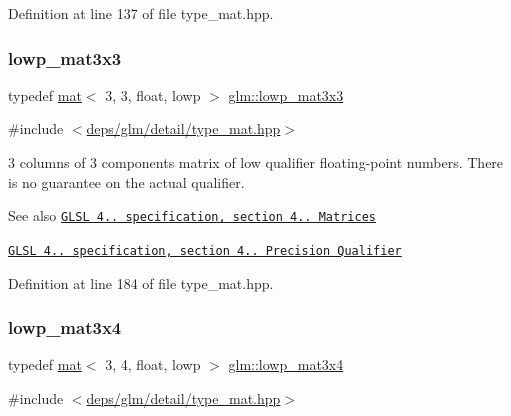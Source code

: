 Definition at line 137 of file type\+\_\+mat.\+hpp.

\mbox{\label{group__core__precision_ga6880ce658287c90c081aa60fa1f6f0a5}} 
\subsubsection{\texorpdfstring{lowp\+\_\+mat3x3}{lowp\_mat3x3}}
{\footnotesize\ttfamily typedef \hyperlink{structglm_1_1mat}{mat}$<$ 3, 3, float, lowp $>$ \hyperlink{group__core__precision_ga6880ce658287c90c081aa60fa1f6f0a5}{glm\+::lowp\+\_\+mat3x3}}



{\ttfamily \#include $<$\hyperlink{type__mat_8hpp}{deps/glm/detail/type\+\_\+mat.\+hpp}$>$}

3 columns of 3 components matrix of low qualifier floating-\/point numbers. There is no guarantee on the actual qualifier.

\begin{DoxySeeAlso}{See also}
\href{http://www.opengl.org/registry/doc/GLSLangSpec.4.20.8.pdf}{\tt G\+L\+SL 4.. specification, section 4.. Matrices} 

\href{http://www.opengl.org/registry/doc/GLSLangSpec.4.20.8.pdf}{\tt G\+L\+SL 4.. specification, section 4.. Precision Qualifier} 
\end{DoxySeeAlso}


Definition at line 184 of file type\+\_\+mat.\+hpp.

\mbox{\label{group__core__precision_ga9340ce338f4e973abeccf7309281ef31}} 
\subsubsection{\texorpdfstring{lowp\+\_\+mat3x4}{lowp\_mat3x4}}
{\footnotesize\ttfamily typedef \hyperlink{structglm_1_1mat}{mat}$<$ 3, 4, float, lowp $>$ \hyperlink{group__core__precision_ga9340ce338f4e973abeccf7309281ef31}{glm\+::lowp\+\_\+mat3x4}}



{\ttfamily \#include $<$\hyperlink{type__mat_8hpp}{deps/glm/detail/type\+\_\+mat.\+hpp}$>$}

